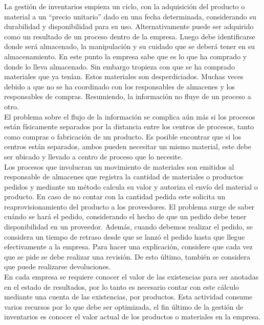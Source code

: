 La gestión de inventarios empieza un ciclo, con la adquisición del producto o material a un “precio unitario” dado en una fecha determinada, considerando su durabilidad y disponibilidad para su uso. Alternativamente puede ser adquirido como un resultado de un proceso dentro de la empresa. Luego debe identificarse donde será almacenado, la manipulación y su cuidado que se deberá tener en su almacenamiento. En este punto la empresa sabe que es lo que ha comprado y donde lo lleva almacenado. Sin embargo tropieza con que se ha comprado materiales que ya tenían. Estos materiales son desperdiciados. Muchas veces debido a que no se ha coordinado con los responsables de almacenes y los responsables de compras. Resumiendo, la información no fluye de un proceso a otro.\\

El problema sobre el flujo de la información se complica aún más si los procesos están físicamente separados por la distancia entre los centros de procesos, tanto como compras o fabricación de un producto. Es posible encontrar que si los centros están separados, ambos pueden necesitar un mismo material, este debe ser ubicado y llevado a centro de proceso que lo necesite.\\

Los procesos que involucran un movimiento de materiales son emitidos al responsable de almacenes que registra la cantidad de materiales o productos pedidos y mediante un método calcula su valor y autoriza el  envío del material o producto. En caso de no contar con la cantidad pedida este solicita un reaprovisionamiento del producto a los proveedores. El problema surge de saber cuándo se hará el pedido, considerando el hecho de que un pedido debe tener disponibilidad en un proveedor. Además, cuando debemos realizar el pedido, se considera un tiempo de retraso desde que se lanzó el pedido hasta que llegue efectivamente a la empresa. Para hacer una explicación, considere que cada vez que se pide se debe realizar una revisión. De esto último, también se considera que puede realizarse devoluciones.\\

En cada empresa se requiere conocer el valor de las existencias para ser anotadas en el estado de resultados, por lo tanto es necesario contar con este cálculo mediante una cuenta de las existencias, por productos. Esta actividad consume varios recursos por lo que debe ser optimizada, el fin último de la gestión de inventarios es conocer el valor actual de los productos o materiales en la empresa.\\

